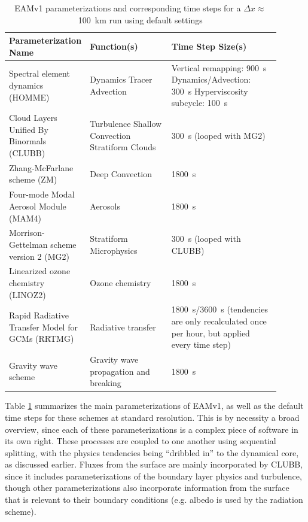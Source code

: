 \documentclass [11pt, proquest] {uwthesis}[2020/02/24]
\begin{document}
\begin{table}
  \centering
  \begin{tabular}{|p{0.2\linewidth}|p{0.3\linewidth}|p{0.4\linewidth}|}
    \hline
    Parameterization Name & Function(s) & Time Step Size(s) \\
    \hline
    {Spectral element \newline dynamics (HOMME)} & {Dynamics \newline Tracer Advection} & {Vertical remapping: \SI{900}{\second} \newline Dynamics/Advection: \SI{300}{\second} \newline Hyperviscosity subcycle: \SI{100}{\second}} \\
    \hline
    Cloud Layers Unified By Binormals (CLUBB) & {Turbulence \newline Shallow Convection \newline Stratiform Clouds} & \SI{300}{\second} (looped with MG2) \\
    \hline
    Zhang-McFarlane scheme (ZM) & Deep Convection & \SI{1800}{\second} \\
    \hline
    Four-mode Modal Aerosol Module (MAM4) & Aerosols & \SI{1800}{\second} \\
    \hline
    Morrison-Gettelman scheme version 2 (MG2) & Stratiform Microphysics & \SI{300}{\second} (looped with CLUBB) \\
    \hline
    Linearized ozone chemistry (LINOZ2) & Ozone chemistry & \SI{1800}{\second} \\
    \hline
    Rapid Radiative Transfer Model for GCMs (RRTMG) & Radiative transfer & \SI{1800}{\second}/\SI{3600}{\second} (tendencies are only recalculated once per hour, but applied every time step) \\
    \hline
    Gravity wave scheme & Gravity wave propagation and breaking & \SI{1800}{\second} \\
    \hline
  \end{tabular}
  \caption{EAMv1 parameterizations and corresponding time steps for a $\Delta x\approx$\SI{100}{\kilo\meter} run using default
    settings}
  \label{tab:physparams}
\end{table}

Table \ref{tab:physparams} summarizes the main parameterizations of EAMv1, as well as the default time steps for these schemes at standard resolution. This is by necessity a broad overview, since each of these parameterizations is a complex piece of software in its own right. These processes are coupled to one another using sequential splitting, with the physics tendencies being ``dribbled in'' to the dynamical core, as discussed earlier. Fluxes from the surface are mainly incorporated by CLUBB, since it includes parameterizations of the boundary layer physics and turbulence, though other parameterizations also incorporate information from the surface that is relevant to their boundary conditions (e.g. albedo is used by the radiation scheme).
\end{document}
